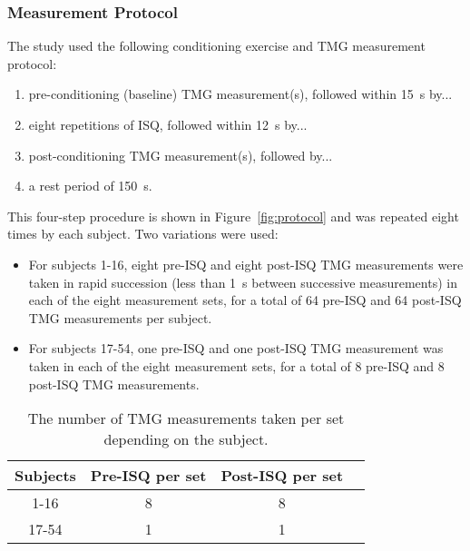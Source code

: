 \documentclass[utf8]{style/FrontiersinHarvard}
\begin{document}
\subsubsection{Measurement Protocol}
The study used the following conditioning exercise and TMG measurement protocol:
\begin{enumerate}

    \item pre-conditioning (baseline) TMG measurement(s), followed within \SI{15}{\second} by...

    \item eight repetitions of ISQ, followed within \SI{12}{\second} by...

    \item post-conditioning TMG measurement(s), followed by...

    \item a rest period of \SI{150}{\second}.

\end{enumerate}
This four-step procedure is shown in Figure~\ref{fig:protocol} and was repeated eight times by each subject.
Two variations were used:
\begin{itemize}

    \item For subjects 1-16, eight pre-ISQ and eight post-ISQ TMG measurements were taken in rapid succession (less than \SI{1}{\second} between successive measurements) in each of the eight measurement sets, for a total of 64 pre-ISQ and 64 post-ISQ TMG measurements per subject.

    \item For subjects 17-54, one pre-ISQ and one post-ISQ TMG measurement was taken in each of the eight measurement sets, for a total of 8 pre-ISQ and 8 post-ISQ TMG measurements.

\end{itemize}

\begin{table}[htb!]
    \centering
    \caption{The number of TMG measurements taken per set depending on the subject.}
    \vspace{1ex}
    \begin{tabular}{|c|c|c|c|}
        \hline {\rule{0pt}{2.0ex}} \hspace{-7pt}
        Subjects & Pre-ISQ per set & Post-ISQ per set \\
        \hline {\rule{0pt}{2.0ex}} \hspace{-7pt}
        1-16 & 8 & 8 \\
        17-54 & 1 & 1 \\
        \hline
    \end{tabular}
    \label{tab:measurements}
\end{table}
\end{document}
